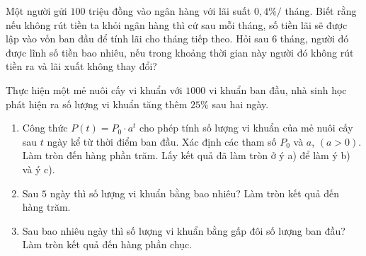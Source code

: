 \begin{bt}%
	Một người gửi $100$ triệu  đồng vào ngân hàng với lãi suất $0{,}4\% /$ tháng. Biết rằng nếu không rút tiền ta khỏi ngân hàng thì cứ sau mỗi tháng, số tiền lãi sẽ được lập vào vốn ban đầu để tính lãi cho tháng tiếp theo. Hỏi sau $6$ tháng, người đó được lĩnh số tiền bao nhiêu, nếu trong khoảng thời gian này người đó không rút tiền ra và lãi xuất không thay đổi?
\end{bt}

\begin{bt}%
	Thực hiện một mẻ nuôi cấy vi khuẩn với $1000$ vi khuẩn ban  đầu, nhà sinh học phát hiện ra số lượng vi khuẩn tăng thêm $25 \%$ sau hai ngày.
	\begin{enumerate}
		\item Công thức $ P(t)= P_0 \cdot a^t$ cho phép tính số lượng vi khuẩn của mẻ nuôi cấy sau $t$ ngày kể từ thời điểm ban đầu. Xác định các tham số $P_0$ và $a$, $(a>0)$. Làm tròn đến hàng phần trăm. Lấy kết quả đã làm tròn ở ý a) để làm ý b) và ý c). 
		\item Sau $5$ ngày thì số lượng vi  khuẩn bằng bao nhiêu? Làm tròn kết quả đến hàng trăm.
		\item Sau bao nhiêu ngày thì số lượng vi khuẩn bằng gấp đôi số lượng ban đầu? Làm tròn kết quả đến hàng phần  chục.
	\end{enumerate}
\end{bt}

